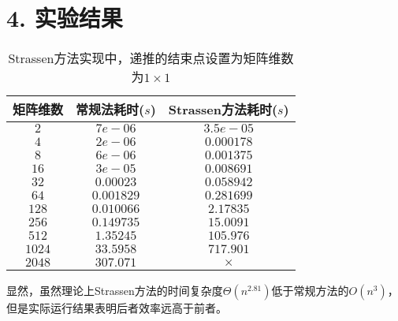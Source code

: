 \documentclass[12pt]{article}
\begin{document}
  \section*{4. 实验结果}
    \begin{table}[h!]
      \begin{center}
        \caption{Strassen方法实现中，递推的结束点设置为矩阵维数为$1\times1$}
        \begin{tabular}{c|c|c}
          \toprule
          \textbf{矩阵维数} & \textbf{常规法耗时($s$)} & \textbf{Strassen方法耗时($s$)}\\
          \midrule
          $2$ & $7e-06$ & $3.5e-05$\\
          $4$ & $2e-06$ & $0.000178$\\
          $8$ & $6e-06$ & $0.001375$\\
          $16$ & $3e-05$ & $0.008691$\\
          $32$ & $0.00023$ & $0.058942$\\
          $64$ & $0.001829$ & $0.281699$\\
          $128$ & $0.010066$ & $2.17835$\\
          $256$ & $0.149735$ & $15.0091$\\
          $512$ & $1.35245$ & $105.976$\\
          $1024$ & $33.5958$ & $717.901$\\
          $2048$ & $307.071$ & $\times$\\
          \bottomrule
        \end{tabular}
      \end{center}
    \end{table}
    显然，虽然理论上Strassen方法的时间复杂度$\Theta(n^{2.81})$低于常规方法的$O(n^3)$，但是实际运行结果表明后者效率远高于前者。\\
\end{document}
